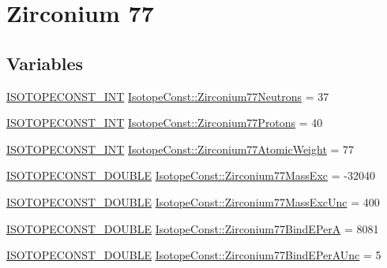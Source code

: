 \hypertarget{group___isotope_const-_zirconium-_zr77}{}\section{Zirconium 77}
\label{group___isotope_const-_zirconium-_zr77}
\subsection*{Variables}
\begin{DoxyCompactItemize}
\item 
\mbox{\hyperlink{group___isotope_const-_macros_ga5f18360b3e99483a35c32d789e62621c}{I\+S\+O\+T\+O\+P\+E\+C\+O\+N\+S\+T\+\_\+\+I\+NT}} \mbox{\hyperlink{group___isotope_const-_zirconium-_zr77_ga4a6ecc72ab2b677bc8937b2ce841a34e}{Isotope\+Const\+::\+Zirconium77\+Neutrons}} = 37
\item 
\mbox{\hyperlink{group___isotope_const-_macros_ga5f18360b3e99483a35c32d789e62621c}{I\+S\+O\+T\+O\+P\+E\+C\+O\+N\+S\+T\+\_\+\+I\+NT}} \mbox{\hyperlink{group___isotope_const-_zirconium-_zr77_ga3f0651857111c200cc27e4b6ee9337a8}{Isotope\+Const\+::\+Zirconium77\+Protons}} = 40
\item 
\mbox{\hyperlink{group___isotope_const-_macros_ga5f18360b3e99483a35c32d789e62621c}{I\+S\+O\+T\+O\+P\+E\+C\+O\+N\+S\+T\+\_\+\+I\+NT}} \mbox{\hyperlink{group___isotope_const-_zirconium-_zr77_ga8917390415dd32fa2ef144ec539dbe34}{Isotope\+Const\+::\+Zirconium77\+Atomic\+Weight}} = 77
\item 
\mbox{\hyperlink{group___isotope_const-_macros_ga8f45a7272ce02c0b4c65c44636ed719a}{I\+S\+O\+T\+O\+P\+E\+C\+O\+N\+S\+T\+\_\+\+D\+O\+U\+B\+LE}} \mbox{\hyperlink{group___isotope_const-_zirconium-_zr77_gaead61dcc1d0b5b4fa224503055db6706}{Isotope\+Const\+::\+Zirconium77\+Mass\+Exc}} = -\/32040
\item 
\mbox{\hyperlink{group___isotope_const-_macros_ga8f45a7272ce02c0b4c65c44636ed719a}{I\+S\+O\+T\+O\+P\+E\+C\+O\+N\+S\+T\+\_\+\+D\+O\+U\+B\+LE}} \mbox{\hyperlink{group___isotope_const-_zirconium-_zr77_ga35157e37d975e64341929407b8d6ebca}{Isotope\+Const\+::\+Zirconium77\+Mass\+Exc\+Unc}} = 400
\item 
\mbox{\hyperlink{group___isotope_const-_macros_ga8f45a7272ce02c0b4c65c44636ed719a}{I\+S\+O\+T\+O\+P\+E\+C\+O\+N\+S\+T\+\_\+\+D\+O\+U\+B\+LE}} \mbox{\hyperlink{group___isotope_const-_zirconium-_zr77_ga61bbc798fa10ad681da826656b13df65}{Isotope\+Const\+::\+Zirconium77\+Bind\+E\+PerA}} = 8081
\item 
\mbox{\hyperlink{group___isotope_const-_macros_ga8f45a7272ce02c0b4c65c44636ed719a}{I\+S\+O\+T\+O\+P\+E\+C\+O\+N\+S\+T\+\_\+\+D\+O\+U\+B\+LE}} \mbox{\hyperlink{group___isotope_const-_zirconium-_zr77_ga5fa6666723257774d4bdc10e3b9cefcb}{Isotope\+Const\+::\+Zirconium77\+Bind\+E\+Per\+A\+Unc}} = 5

\end{DoxyCompactItemize}
